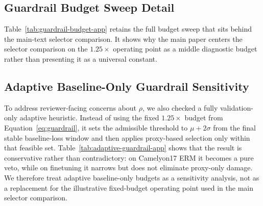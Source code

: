\begin{table}[h]
  \centering
  \small
  \resizebox{\columnwidth}{!}{}
  \caption{
    Paired bootstrap intervals for proxy-only $\rightarrow$ guardrail changes.
    Positive loss/tail reductions mean the guardrail removes harm relative to proxy-only selection.
  }
  \label{tab:guardrail-uncertainty}
\end{table}

\subsection{Guardrail Budget Sweep Detail}
Table~\ref{tab:guardrail-budget-app} retains the full budget sweep that sits behind the main-text selector comparison.
It shows why the main paper centers the selector comparison on the $1.25\times$ operating point as a middle diagnostic budget rather than presenting it as a universal constant.

\begin{table}[h]
  \centering
  \small
  \resizebox{\columnwidth}{!}{}
  \caption{
    Full budget sweep on the two Camelyon17 anchor suites.
    The $1.10\times$ budget is essentially a veto, $1.50\times$ is materially looser, and $1.25\times$ is the middle illustrative diagnostic budget used in the main text.
  }
  \label{tab:guardrail-budget-app}
\end{table}

\subsection{Adaptive Baseline-Only Guardrail Sensitivity}
\label{app:adaptive-guardrail}
To address reviewer-facing concerns about $\rho$, we also checked a fully validation-only adaptive heuristic.
Instead of using the fixed $1.25\times$ budget from Equation~\ref{eq:guardrail}, it sets the admissible threshold to $\mu+2\sigma$ from the final stable baseline-loss window and then applies proxy-based selection only within that feasible set.
Table~\ref{tab:adaptive-guardrail-app} shows that the result is conservative rather than contradictory: on Camelyon17 ERM it becomes a pure veto, while on finetuning it narrows but does not eliminate proxy-only damage.
We therefore treat adaptive baseline-only budgets as a sensitivity analysis, not as a replacement for the illustrative fixed-budget operating point used in the main selector comparison.

